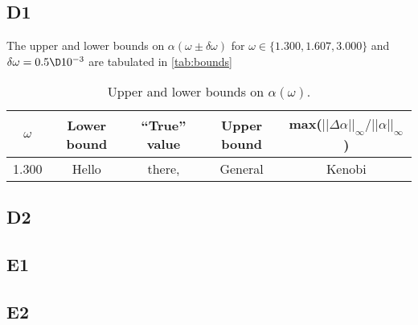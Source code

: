 \documentclass[a4paper,10pt]{article}
\begin{document}
	\subsection*{D1}
	The upper and lower bounds on $ \alpha(\omega\pm \delta \omega) $ for $ \omega \in \{1.300, 1.607, 3.000\} $ and $ \delta \omega = 0.5\D10^{-3} $ are tabulated in \ref{tab:bounds}
	\begin{table}[H]
		\centering
		\begin{tabular}{c|c|c|c|c}
			$ \omega $ & Lower bound & ``True'' value & Upper bound & max($ ||\Delta\alpha||_{\infty}/||\alpha||_{\infty} $) \\
			\hline
			1.300 & Hello & there, & General & Kenobi
		\end{tabular}
		\caption{Upper and lower bounds on $ \alpha(\omega) $.}
	\end{table}
	
	\subsection*{D2}
	
	\subsection*{E1}
	
	
	\subsection*{E2}
	
	
\end{document}
